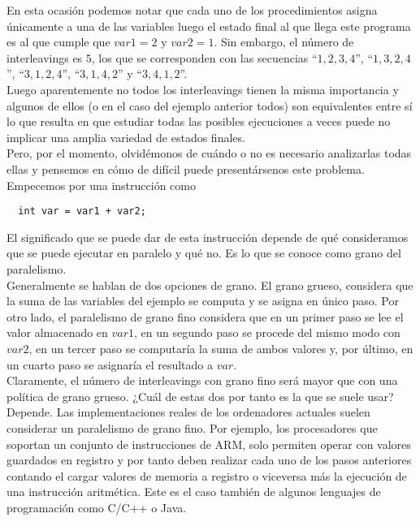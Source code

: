 En esta ocasión podemos notar que cada uno de los procedimientos asigna únicamente a una de las variables luego el estado final al que llega este programa es al que cumple que $var1 = 2$ y $var2 = 1$. Sin embargo, el número de interleavings es $5$, los que se corresponden con las secuencias ``$1, 2, 3, 4$'', ``$1, 3, 2, 4$'', ``$3, 1, 2, 4$'', ``$3, 1, 4, 2$'' y ``$3, 4, 1, 2$''.\\

Luego aparentemente no todos los interleavings tienen la misma importancia y algunos de ellos (o en el caso del ejemplo anterior todos) son equivalentes entre sí lo que resulta en que estudiar todas las posibles ejecuciones a veces puede no implicar una amplia variedad de estados finales.\\

Pero, por el momento, olvidémonos de cuándo o no es necesario analizarlas todas ellas y pensemos en cómo de difícil puede presentársenos este problema.\\

Empecemos por una instrucción como
\begin{lstlisting}
  int var = var1 + var2;
\end{lstlisting}
El significado que se puede dar de esta instrucción depende de qué consideramos que se puede ejecutar en paralelo y qué no. Es lo que se conoce como grano del paralelismo.\\

Generalmente se hablan de dos opciones de grano. El grano grueso, considera que la suma de las variables del ejemplo se computa y se asigna en único paso. Por otro lado, el paralelismo de grano fino considera que en un primer paso se lee el valor almacenado en $var1$, en un segundo paso se procede del mismo modo con $var2$, en un tercer paso se computaría la suma de ambos valores y, por último, en un cuarto paso se asignaría el resultado a $var$.\\

Claramente, el número de interleavings con grano fino será mayor que con una política de grano grueso. ¿Cuál de estas dos por tanto es la que se suele usar? Depende. Las implementaciones reales de los ordenadores actuales suelen considerar un paralelismo de grano fino. Por ejemplo, los procesadores que soportan un conjunto de instrucciones de ARM, solo permiten operar con valores guardados en registro y por tanto deben realizar cada uno de los pasos anteriores contando el cargar valores de memoria a registro o viceversa más la ejecución de una instrucción aritmética. Este es el caso también de algunos lenguajes de programación como C/C++ o Java.\\

